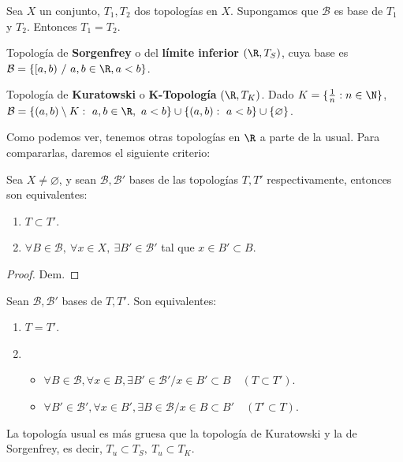 \begin{nprop}
  Sea $X$ un conjunto, $T_1,T_2$ dos topologías en $X$. Supongamos que $\mathcal{B}$ es base de $T_1$ y $T_2$. Entonces $T_1 = T_2$.
\end{nprop}
\begin{exmp}
  Topología de \textbf{Sorgenfrey} o del \textbf{límite inferior} $(\R,T_S)$, cuya base es $\mathcal{B}=\{[a,b)\ /\ a,b \in \R, a<b\} $.
\end{exmp}
\begin{exmp}
    Topología de \textbf{Kuratowski} o \textbf{K-Topología} $(\R, T_K)$. Dado $K = \{\frac{1}{n} : n \in \N\}$, $\mathcal{B} = \{(a,b) \setminus K :\ a,b \in \R,\ a<b\} \cup \{(a,b) :\ a<b\} \cup \{ \varnothing \}$.
\end{exmp}
Como podemos ver, tenemos otras topologías en $\R$ a parte de la usual. Para compararlas, daremos el siguiente criterio:
\begin{properties}
    Sea $X \neq \varnothing$, y sean $\mathcal{B}, \mathcal{B}'$ bases de las topologías $T,T'$ respectivamente, entonces son equivalentes:
    \begin{enumerate}
        \item $T \subset T'$.
        \item $\forall B \in \mathcal{B},\ \forall x \in X,\ \exists B' \in \mathcal{B}'$ tal que $x \in B' \subset B$.
    \end{enumerate}
\end{properties}
\begin{proof}
    Dem.
\end{proof}
\begin{ncor}
  Sean $\mathcal{B}, \mathcal{B}'$ bases de $T,T'$. Son equivalentes:
  \begin{enumerate}
    \item $T=T'$.
    \item \begin{itemize}
            \item $\forall B \in \mathcal{B}, \forall x \in B, \exists B' \in \mathcal{B}' / x \in B' \subset B \quad (T \subset T')$.
            \item $\forall B' \in \mathcal{B}', \forall x \in B', \exists B \in \mathcal{B} / x \in B \subset B' \quad (T' \subset T)$.
          \end{itemize}
  \end{enumerate}
\end{ncor}
\begin{properties}
    La topología usual es más gruesa que la topología de Kuratowski y la de Sorgenfrey, es decir, $T_u \subset T_S,\ T_u \subset T_K$.
\end{properties}
